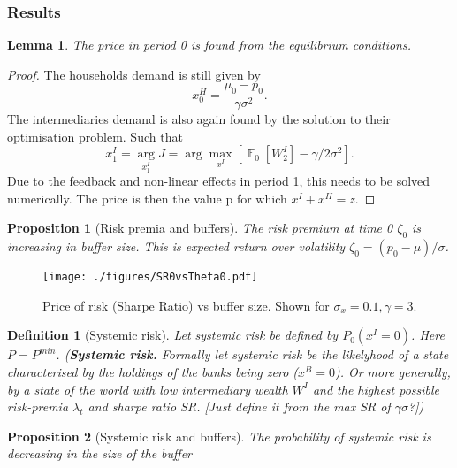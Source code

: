 \documentclass[11pt]{article}
\DeclareMathOperator{\E}{\mathbb{E}} %
\newtheorem{proposition}{Proposition}
\newtheorem{lemma}{Lemma}%
\newtheorem{definition}{Definition}%
\begin{document}
\begin{appendices}
\subsubsection*{Results}

\begin{lemma}
The price in period 0 is found from the equilibrium conditions.
\end{lemma}
\begin{proof}
The households demand is still given by
\begin{equation}
x^H_0 = \frac{\mu_0-p_0}{\gamma \sigma^2}.
\end{equation}
The intermediaries demand is also again found by the solution to their optimisation problem. Such that
\begin{equation}
x^{I}_1 = \underset{x^{I}_1}{\arg} J = \arg \max_{x^I}\left[\E_0[W^I_2] - \gamma/2\sigma^2\right].
\end{equation}
Due to the feedback and non-linear effects in period 1, this needs to be solved numerically. 
The price is then the value p for which $x^I+x^H = z$.
\end{proof}


\begin{proposition}[Risk premia and buffers]
The risk premium at time 0 $\zeta_0$ is increasing in buffer size.
This is expected return over volatility $\zeta_0 = (p_0 - \mu)/ \sigma$.
\end{proposition}

\begin{figure}[h]
\centering
\texttt{[image: ./figures/SR0vsTheta0.pdf]}
\caption{Price of risk (Sharpe Ratio) vs buffer size. Shown for $\sigma_x = 0.1, \gamma = 3$. }
\label{f_probSRvsBuffer}
\end{figure}


\begin{definition}[Systemic risk]
Let systemic risk be defined by $P_0 (x^I=0)$. Here $P = P^{min}$.
(\textbf{Systemic risk.} Formally let systemic risk be the likelyhood of a state characterised by the holdings of the banks being zero ($x^B = 0$). Or more generally, by a state of the world with low intermediary wealth $W^I$ and the highest possible risk-premia $\lambda_t$ and sharpe ratio SR. [Just define it from the max SR of $\gamma\sigma$?])
\end{definition}


\begin{proposition}[Systemic risk and buffers]
The probability of systemic risk is decreasing in the size of the buffer
\end{proposition}



\end{appendices}
\end{document}
